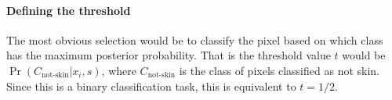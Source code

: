 \paragraph{Defining the threshold}
The most obvious selection would be to classify the pixel based on which class has the maximum posterior probability. That is the threshold value $t$ would be $\Pr(C_\text{not-skin}| x_i, s)$, where $C_\text{not-skin}$ is the class of pixels classified as not skin. Since this is a binary classification task, this is equivalent to $t=1/2$.
